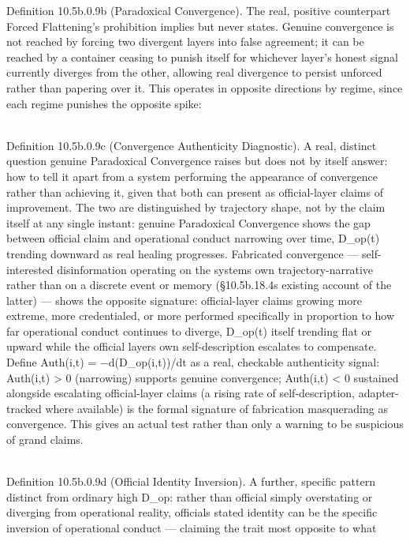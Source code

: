 \documentclass[
]{article}
\begin{document}
Definition 10.5b.0.9b (Paradoxical Convergence). The real, positive
counterpart Forced Flattening's prohibition implies but never states.
Genuine convergence is not reached by forcing two divergent layers into
false agreement; it can be reached by a container ceasing to punish
itself for whichever layer's honest signal currently diverges from the
other, allowing real divergence to persist unforced rather than papering
over it. This operates in opposite directions by regime, since each
regime punishes the opposite spike:\\
\strut \\
Definition 10.5b.0.9c (Convergence Authenticity Diagnostic). A real,
distinct question genuine Paradoxical Convergence raises but does not by
itself answer: how to tell it apart from a system performing the
appearance of convergence rather than achieving it, given that both can
present as official-layer claims of improvement. The two are
distinguished by trajectory shape, not by the claim itself at any single
instant: genuine Paradoxical Convergence shows the gap between official
claim and operational conduct narrowing over time, D\_op(t) trending
downward as real healing progresses. Fabricated convergence ---
self-interested disinformation operating on the system\textquotesingle s
own trajectory-narrative rather than on a discrete event or memory
(§10.5b.18.4\textquotesingle s existing account of the latter) --- shows
the opposite signature: official-layer claims growing more extreme, more
credentialed, or more performed specifically in proportion to how far
operational conduct continues to diverge, D\_op(t) itself trending flat
or upward while the official layer\textquotesingle s own
self-description escalates to compensate. Define Auth(i,t) =
−d(D\_op(i,t))/dt as a real, checkable authenticity signal: Auth(i,t)
\textgreater{} 0 (narrowing) supports genuine convergence; Auth(i,t)
\textless{} 0 sustained alongside escalating official-layer claims (a
rising rate of self-description, adapter-tracked where available) is the
formal signature of fabrication masquerading as convergence. This gives
an actual test rather than only a warning to be suspicious of grand
claims.\\
\strut \\
Definition 10.5b.0.9d (Official Identity Inversion). A further, specific
pattern distinct from ordinary high D\_op: rather than official simply
overstating or diverging from operational reality,
official\textquotesingle s stated identity can be the specific inversion
of operational conduct --- claiming the trait most opposite to what
\end{document}
